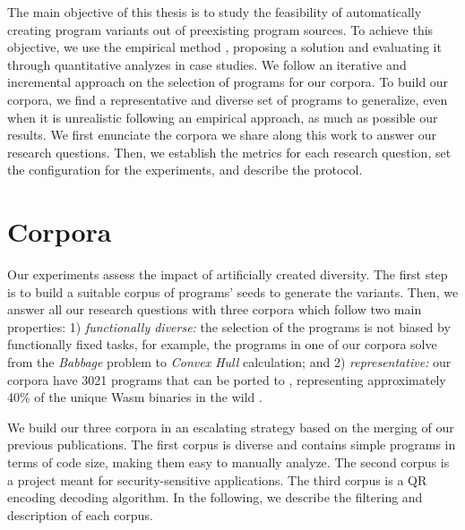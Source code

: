 The main objective of this thesis is to study the feasibility of automatically creating program variants out of preexisting program sources. To achieve this objective,
we use the empirical method \cite{Runeson2020}, proposing a solution and evaluating it through quantitative analyzes in case studies. We follow an iterative and incremental approach on the selection of programs for our corpora. To build our corpora, we find a representative and diverse set of programs to generalize, even when it is unrealistic following an empirical approach, as much as possible our results.
We first enunciate the corpora we share along this work to answer our research questions. Then, we establish the metrics for each research question, set the configuration for the experiments, and describe the protocol.



\section{Corpora}
\label{section:crow:corpora}

Our experiments assess the impact of artificially created diversity. The first step is to build a suitable corpus of programs' seeds to generate the variants. Then, we answer all our research questions with three corpora which follow two main properties: 1) \emph{functionally diverse:} the selection of the programs is not biased by functionally fixed tasks, for example, the programs in one of our corpora solve from the \textit{Babbage} problem to \textit{Convex Hull} calculation; and 2) \emph{representative:} our corpora have 3021 programs that can be ported to \wasm, representing approximately 40\% of the unique Wasm binaries in the wild \cite{Hilbig2021AnES}.


We build our three corpora in an escalating strategy based on the merging of our previous publications. The first corpus is diverse and contains simple programs in terms of code size, making them easy to manually analyze. The second corpus is a project meant for security-sensitive applications. The third corpus is a QR encoding decoding algorithm. 
In the following, we describe the filtering and description of each corpus.

